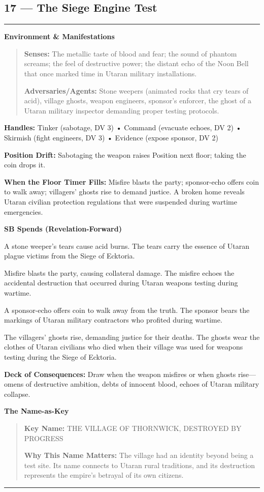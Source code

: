 \documentclass[18pt, letterpaper, twoside]{article}
\newenvironment{floorbox}[1]{%
    \begin{center}
    \begin{minipage}{0.95\textwidth}
    \subsection*{#1}
    \vspace{-0.5em}
    \rule{\textwidth}{0.5pt}
    \vspace{0.5em}
}{%
    \vspace{0.5em}
    \rule{\textwidth}{0.5pt}
    \end{minipage}
    \end{center}
}
\newenvironment{gmnote}[1]{%
    \vspace{0.5em}
    \noindent\textbf{#1}
    \begin{quote}
}{%
    \end{quote}
    \vspace{0.5em}
}
\newcommand{\handles}[1]{\noindent\textbf{Handles:} #1\par}
\newcommand{\sbitem}[2]{\item[#1 SB:] #2}
\newcommand{\deckdraw}[1]{\noindent\textbf{Deck of Consequences:} #1\par}
\newcommand{\keyname}[1]{\noindent\textbf{Key Name:} #1\par}
\newcommand{\nameimportance}[1]{\noindent\textbf{Why This Name Matters:} #1\par}
\begin{document}
\begin{floorbox}{17 --- The Siege Engine Test}
\begin{gmnote}{Environment \& Manifestations}
\textbf{Senses:} The metallic taste of blood and fear; the sound of phantom screams; the feel of destructive power; the distant echo of the Noon Bell that once marked time in Utaran military installations.

\textbf{Adversaries/Agents:} Stone weepers (animated rocks that cry tears of acid), village ghosts, weapon engineers, sponsor's enforcer, the ghost of a Utaran military inspector demanding proper testing protocols.
\end{gmnote}

\handles{Tinker (sabotage, DV 3) • Command (evacuate echoes, DV 2) • Skirmish (fight engineers, DV 3) • Evidence (expose sponsor, DV 2)}

\textbf{Position Drift:} Sabotaging the weapon raises Position next floor; taking the coin drops it.

\textbf{When the Floor Timer Fills:} Misfire blasts the party; sponsor-echo offers coin to walk away; villagers' ghosts rise to demand justice. A broken home reveals Utaran civilian protection regulations that were suspended during wartime emergencies.

\textbf{SB Spends (Revelation-Forward)}
\begin{description}[leftmargin=*, style=unboxed]
    \sbitem{1}{A stone weeper's tears cause acid burns. The tears carry the essence of Utaran plague victims from the Siege of Ecktoria.}
    \sbitem{2}{Misfire blasts the party, causing collateral damage. The misfire echoes the accidental destruction that occurred during Utaran weapons testing during wartime.}
    \sbitem{3}{A sponsor-echo offers coin to walk away from the truth. The sponsor bears the markings of Utaran military contractors who profited during wartime.}
    \sbitem{4+}{The villagers' ghosts rise, demanding justice for their deaths. The ghosts wear the clothes of Utaran civilians who died when their village was used for weapons testing during the Siege of Ecktoria.}
\end{description}

\deckdraw{Draw when the weapon misfires or when ghosts rise---omens of destructive ambition, debts of innocent blood, echoes of Utaran military collapse.}

\begin{gmnote}{The Name-as-Key}
\keyname{THE VILLAGE OF THORNWICK, DESTROYED BY PROGRESS}
\nameimportance{The village had an identity beyond being a test site. Its name connects to Utaran rural traditions, and its destruction represents the empire's betrayal of its own citizens.}


\end{gmnote}
\end{floorbox}
\end{document}
